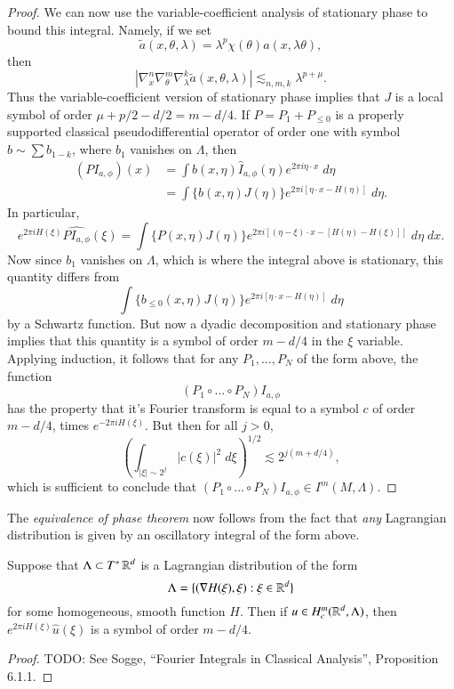\begin{proof}
    We can now use the variable-coefficient analysis of stationary phase to bound this integral. Namely, if we set
    \[ \tilde{a}(x,\theta,\lambda) = \lambda^p \chi(\theta) a(x,\lambda \theta), \]
    then
    \[ |\nabla^n_x \nabla^m_\theta \nabla^k_\lambda \tilde{a}(x, \theta, \lambda)| \lesssim_{n,m,k} \lambda^{p + \mu}. \]
    Thus the variable-coefficient version of stationary phase implies that $J$ is a local symbol of order $\mu + p/2 - d/2 = m - d/4$. If $P = P_1 + P_{\leq 0}$ is a properly supported classical pseudodifferential operator of order one with symbol $b \sim \sum b_{1-k}$, where $b_1$ vanishes on $\Lambda$, then
    \begin{align*}
        (P I_{a,\phi})(x) &= \int b(x,\eta) \widehat{I}_{a,\phi}(\eta) e^{2 \pi i \eta \cdot x}\; d\eta\\
        &= \int \{ b(x,\eta)  J(\eta) \} e^{2 \pi i [\eta \cdot x - H(\eta)]}\; d\eta.
    \end{align*}
    In particular,
    \[ e^{2 \pi i H(\xi)} \widehat{P I_{a,\phi}}(\xi) = \int \{ P(x,\eta) J(\eta) \} e^{2 \pi i [ (\eta - \xi) \cdot x - [H(\eta) - H(\xi)] ]}\; d\eta\; dx. \]
    Now since $b_1$ vanishes on $\Lambda$, which is where the integral above is stationary, this quantity differs from
    \[ \int \{ b_{\leq 0}(x,\eta) J(\eta) \} e^{2 \pi i [\eta \cdot x - H(\eta)]}\; d\eta \]
    by a Schwartz function. But now a dyadic decomposition and stationary phase implies that this quantity is a symbol of order $m - d/4$ in the $\xi$ variable. Applying induction, it follows that for any $P_1,\dots,P_N$ of the form above, the function
    \[ (P_1 \circ \dots \circ P_N) I_{a,\phi} \]
    has the property that it's Fourier transform is equal to a symbol $c$ of order $m - d/4$, times $e^{-2 \pi i H(\xi)}$. But then for all $j > 0$,
    \[ \left( \int_{|\xi| \sim 2^j} |c(\xi)|^2\; d\xi \right)^{1/2} \lesssim 2^{j(m + d/4)}, \]
    which is sufficient to conclude that $(P_1 \circ \dots \circ P_N) I_{a,\phi} \in I^m(M,\Lambda)$.
\end{proof}

The \emph{equivalence of phase theorem} now follows from the fact that \emph{any} Lagrangian distribution is given by an oscillatory integral of the form above.

\begin{lemma}
    Suppose that $\Lambda \subset T^* \operatorname{\mathbb{R}}^d$ is a Lagrangian distribution of the form
    \[ \Lambda = \{ (\nabla H(\xi), \xi) : \xi \in \operatorname{\mathbb{R}}^d \} \]
    for some homogeneous, smooth function $H$. Then if $u \in H^m_c(\operatorname{\mathbb{R}}^d, \Lambda)$, then $e^{2 \pi i H(\xi)} \widehat{u}(\xi)$ is a symbol of order $m - d/4$.
\end{lemma}
\begin{proof}
    TODO: See Sogge, ``Fourier Integrals in Classical Analysis'', Proposition 6.1.1.
\end{proof}

